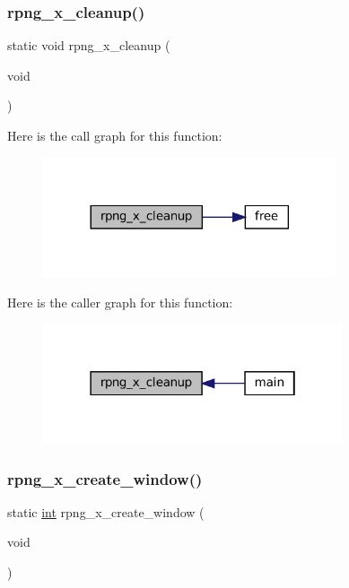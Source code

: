 \subsubsection{\texorpdfstring{rpng\+\_\+x\+\_\+cleanup()}{rpng\_x\_cleanup()}}
{\footnotesize\ttfamily static void rpng\+\_\+x\+\_\+cleanup (\begin{DoxyParamCaption}\item[{void}]{ }\end{DoxyParamCaption})\hspace{0.3cm}{\ttfamily [static]}}

Here is the call graph for this function\+:
\nopagebreak
\begin{figure}[H]
\begin{center}
\leavevmode
\includegraphics[width=245pt]{rpng-x_8c_ac718542858c367c8ecb211043ca7d561_cgraph}
\end{center}
\end{figure}
Here is the caller graph for this function\+:
\nopagebreak
\begin{figure}[H]
\begin{center}
\leavevmode
\includegraphics[width=250pt]{rpng-x_8c_ac718542858c367c8ecb211043ca7d561_icgraph}
\end{center}
\end{figure}
\mbox{\label{rpng-x_8c_aa0248c83cb58e449c3bfadfa665a5e3a}} 
\subsubsection{\texorpdfstring{rpng\+\_\+x\+\_\+create\+\_\+window()}{rpng\_x\_create\_window()}}
{\footnotesize\ttfamily static \mbox{\hyperlink{ioapi_8h_a787fa3cf048117ba7123753c1e74fcd6}{int}} rpng\+\_\+x\+\_\+create\+\_\+window (\begin{DoxyParamCaption}\item[{void}]{ }\end{DoxyParamCaption})\hspace{0.3cm}{\ttfamily [static]}}

